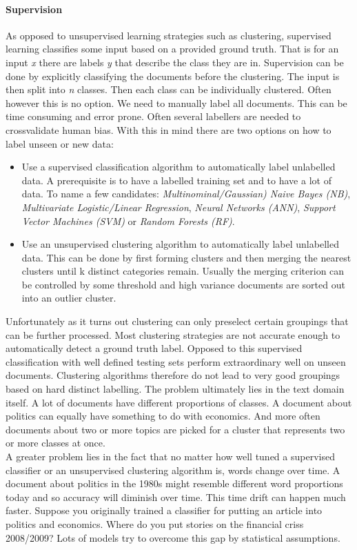   \paragraph{Supervision}

    As opposed to unsupervised learning strategies such as clustering, supervised learning classifies some input based on a provided ground truth. That is for an input \emph{x} there are labels \emph{y} that describe the class they are in. Supervision can be done by explicitly classifying the documents before the clustering. The input is then split into \emph{n} classes. Then each class can be individually clustered. Often however this is no option. We need to manually label all documents. This can be time consuming and error prone. Often several labellers are needed to crossvalidate human bias.
    With this in mind there are two options on how to label unseen or new data:

      \begin{itemize}
        \item Use a supervised classification algorithm to automatically label unlabelled data. A prerequisite is to have a labelled training set and to have a lot of data. To name a few candidates: \emph{Multinominal/Gaussian) Naive Bayes (NB)}, \emph{Multivariate Logistic/Linear Regression}, \emph{Neural Networks (ANN)}, \emph{Support Vector Machines (SVM)} or \emph{Random Forests (RF)}. \cite{Nothing}
        \item Use an unsupervised clustering algorithm to automatically label unlabelled data. This can be done by first forming clusters and then merging the nearest clusters until k distinct categories remain. Usually the merging criterion can be controlled by some threshold and high variance documents are sorted out into an outlier cluster.
      \end{itemize}

    Unfortunately as it turns out clustering can only preselect certain groupings that can be further processed. Most clustering strategies are not accurate enough to automatically detect a ground truth label. Opposed to this supervised classification with well defined testing sets perform extraordinary well on unseen documents. Clustering algorithms therefore do not lead to very good groupings based on hard distinct labelling. The problem ultimately lies in the text domain itself. A lot of documents have different proportions of classes. A document about politics can equally have something to do with economics. And more often documents about two or more topics are picked for a cluster that represents two or more classes at once. \cite{Nothing} \\
    A greater problem lies in the fact that no matter how well tuned a supervised classifier or an unsupervised clustering algorithm is, words change over time. A document about politics in the 1980s might resemble different word proportions today and so accuracy will diminish over time. This time drift can happen much faster. Suppose you originally trained a classifier for putting an article into politics and economics. Where do you put stories on the financial criss 2008/2009? Lots of models try to overcome this gap by statistical assumptions.

